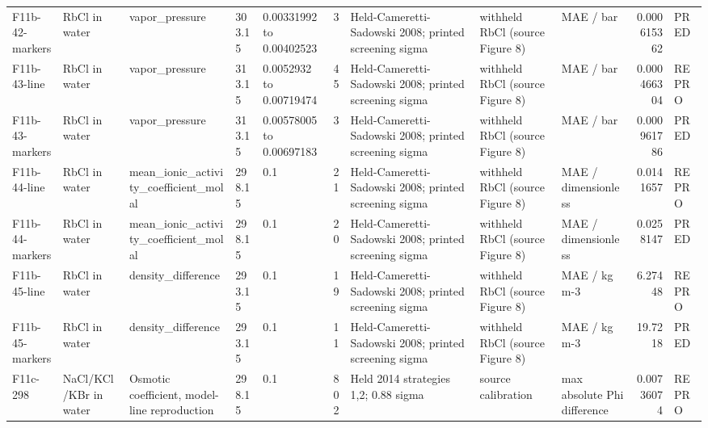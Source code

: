 \begin{landscape}
\begin{longtable}{L{1.9cm}L{2.5cm}L{2.1cm}L{1.6cm}L{1.6cm}rL{2.4cm}L{1.9cm}L{2.2cm}rL{1cm}}
F11b-\allowbreak{}42-\allowbreak{}markers & RbCl in water & vapor\_\allowbreak{}pressure & 303.15 & 0.00331992 to 0.00402523 & 3 & Held-\allowbreak{}Cameretti-\allowbreak{}Sadowski 2008; printed screening sigma & withheld RbCl (source Figure 8) & MAE /\allowbreak{} bar & 0.000615362 & PRED \\
F11b-\allowbreak{}43-\allowbreak{}line & RbCl in water & vapor\_\allowbreak{}pressure & 313.15 & 0.0052932 to 0.00719474 & 45 & Held-\allowbreak{}Cameretti-\allowbreak{}Sadowski 2008; printed screening sigma & withheld RbCl (source Figure 8) & MAE /\allowbreak{} bar & 0.000466304 & REPRO \\
F11b-\allowbreak{}43-\allowbreak{}markers & RbCl in water & vapor\_\allowbreak{}pressure & 313.15 & 0.00578005 to 0.00697183 & 3 & Held-\allowbreak{}Cameretti-\allowbreak{}Sadowski 2008; printed screening sigma & withheld RbCl (source Figure 8) & MAE /\allowbreak{} bar & 0.000961786 & PRED \\
F11b-\allowbreak{}44-\allowbreak{}line & RbCl in water & mean\_\allowbreak{}ionic\_\allowbreak{}activity\_\allowbreak{}coefficient\_\allowbreak{}molal & 298.15 & 0.1 & 21 & Held-\allowbreak{}Cameretti-\allowbreak{}Sadowski 2008; printed screening sigma & withheld RbCl (source Figure 8) & MAE /\allowbreak{} dimensionless & 0.0141657 & REPRO \\
F11b-\allowbreak{}44-\allowbreak{}markers & RbCl in water & mean\_\allowbreak{}ionic\_\allowbreak{}activity\_\allowbreak{}coefficient\_\allowbreak{}molal & 298.15 & 0.1 & 20 & Held-\allowbreak{}Cameretti-\allowbreak{}Sadowski 2008; printed screening sigma & withheld RbCl (source Figure 8) & MAE /\allowbreak{} dimensionless & 0.0258147 & PRED \\
F11b-\allowbreak{}45-\allowbreak{}line & RbCl in water & density\_\allowbreak{}difference & 293.15 & 0.1 & 19 & Held-\allowbreak{}Cameretti-\allowbreak{}Sadowski 2008; printed screening sigma & withheld RbCl (source Figure 8) & MAE /\allowbreak{} kg m-\allowbreak{}3 & 6.27448 & REPRO \\
F11b-\allowbreak{}45-\allowbreak{}markers & RbCl in water & density\_\allowbreak{}difference & 293.15 & 0.1 & 11 & Held-\allowbreak{}Cameretti-\allowbreak{}Sadowski 2008; printed screening sigma & withheld RbCl (source Figure 8) & MAE /\allowbreak{} kg m-\allowbreak{}3 & 19.7218 & PRED \\
F11c-\allowbreak{}298 & NaCl/\allowbreak{}KCl/\allowbreak{}KBr in water & Osmotic coefficient, model-\allowbreak{}line reproduction & 298.15 & 0.1 & 802 & Held 2014 strategies 1,2; 0.88 sigma & source calibration & max absolute Phi difference & 0.00736074 & REPRO \\

\end{longtable}
\end{landscape}
